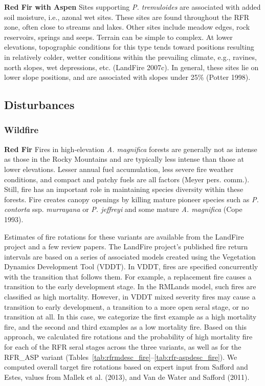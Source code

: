 \noindent \textbf{Red Fir with Aspen} Sites supporting \emph{P. tremuloides} are associated with added soil moisture, i.e., azonal wet sites. These sites are found throughout the RFR zone, often close to streams and lakes. Other sites include meadow edges, rock reservoirs, springs and seeps. Terrain can be simple to complex. At lower elevations, topographic conditions for this type tends toward positions resulting in relatively colder, wetter conditions within the prevailing climate, e.g., ravines, north slopes, wet depressions, etc. (LandFire 2007c). In general, these sites lie on lower slope positions, and are associated with slopes under 25\% (Potter 1998).

\subsection*{Disturbances}

\subsubsection{Wildfire}

\textbf{Red Fir} Fires in high-elevation \emph{A. magnifica} forests are generally not as intense as those in the Rocky Mountains and are typically less intense than those at lower elevations. Lesser annual fuel accumulation, less severe fire weather conditions, and compact and patchy fuels are all factors (Meyer pers. comm.). Still, fire has an important role in maintaining species diversity within these forests. Fire creates canopy openings by killing mature pioneer species such as \emph{P. contorta} ssp. \emph{murrayana} or \emph{P. jeffreyi} and some mature \emph{A. magnifica} (Cope 1993). 

Estimates of fire rotations for these variants are available from the LandFire project and a few review papers. The LandFire project’s published fire return intervals are based on a series of associated models created using the Vegetation Dynamics Development Tool (VDDT). In VDDT, fires are specified concurrently with the transition that follows them. For example, a replacement fire causes a transition to the early development stage. In the RMLands model, such fires are classified as high mortality. However, in VDDT mixed severity fires may cause a transition to early development, a transition to a more open seral stage, or no transition at all. In this case, we categorize the first example as a high mortality fire, and the second and third examples as a low mortality fire. Based on this approach, we calculated fire rotations and the probability of high mortality fire for each of the RFR seral stages across the three variants, as well as for the RFR\_ASP variant (Tables~\ref{tab:rfrmdesc_fire}--\ref{tab:rfr-aspdesc_fire}). We computed overall target fire rotations based on expert input from Safford and Estes, values from Mallek et al. (2013), and Van de Water and Safford (2011). 





